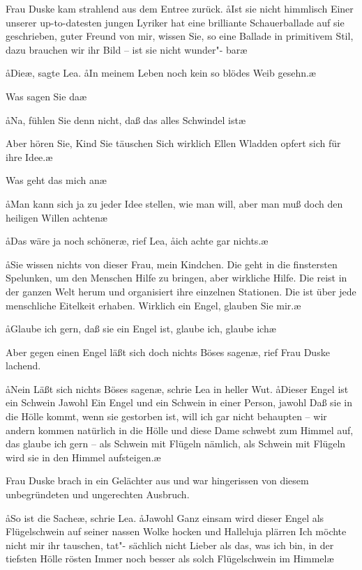 Frau Duske kam strahlend aus dem Entree zurück. \aa{}Ist sie
nicht himmlisch\frag{} Einer unserer up-to-datesten jungen Lyriker
hat eine brilliante Schauerballade auf sie geschrieben, guter
Freund von mir, wissen Sie, so eine Ballade in primitivem
Stil, dazu brauchen wir ihr Bild -- ist sie nicht wunder"-%
bar\frag{}\ae{}

\aa{}Die\frag{}\ae{}, sagte Lea. \aa{}In meinem Leben noch kein so blödes
Weib gesehn.\ae{}

\aanah{}Was sagen Sie da\frag{}\ae{}

\aa{}Na, fühlen Sie denn nicht, daß das alles Schwindel ist\frag{}\ae{}

\aanah{}Aber hören Sie, Kind\ausr{} Sie täuschen Sich\eingriff{eS64-1}{Sich ] sich} wirklich\ausr{} Ellen
Wladden opfert sich für ihre Idee.\ae{}

\aanah{}Was geht das mich an\ausr{}\ae{}

\aa{}Man kann sich ja zu jeder Idee stellen, wie man will, aber man
muß doch den heiligen Willen achten\ausr{}\ae{}

\aa{}Das wäre ja noch schöner\ae{},\eingriff{eS65-1}{schöner\ae{}, ] schöner,\ae{}} rief Lea, \aa{}ich achte gar nichts.\ae{}

\aa{}Sie wissen nichts von dieser Frau, mein Kindchen. Die geht
in die finstersten Spelunken, um den Menschen Hilfe zu
bringen, aber wirkliche Hilfe. Die reist in der ganzen Welt
herum und organisiert ihre einzelnen Stationen. Die ist über
jede menschliche Eitelkeit erhaben. Wirklich ein Engel, glauben
Sie mir.\ae{}

\aa{}Glaube ich gern, daß sie ein Engel ist, glaube ich, glaube ich\ausr{}\ae{}

\aanah{}Aber gegen einen Engel läßt sich doch nichts Böses sagen\frag{}\ae{},
rief Frau Duske lachend.

\aa{}Nein\frag{} Läßt sich nichts Böses sagen\frag{}\ae{}, schrie Lea in heller
Wut. \aa{}Dieser Engel ist ein Schwein\ausr{} Jawohl\ausr{} Ein Engel und
ein Schwein in einer Person, jawohl\ausr{} Daß sie in die Hölle
kommt, wenn sie gestorben ist, will ich gar nicht behaupten --
wir andern kommen natürlich in die Hölle und diese Dame
schwebt zum Himmel auf, das glaube ich gern -- als Schwein
mit Flügeln nämlich, als Schwein mit Flügeln wird sie in den
Himmel aufsteigen.\ae{}

Frau Duske brach in ein Gelächter aus und war hingerissen
von diesem unbegründeten und ungerechten Ausbruch.

\aa{}So ist die Sache\ausr{}\ae{}, schrie Lea. \aa{}Jawohl\ausr{} Ganz einsam wird
dieser Engel als Flügelschwein auf seiner nassen Wolke hocken
und Halleluja plärren\ausr{} Ich möchte nicht mir ihr tauschen, tat"-%
sächlich nicht\ausr{} Lieber als das, was ich bin, in der tiefsten Hölle
rösten\ausr{} Immer noch besser als solch Flügelschwein im
Himmel\ausr{}\ae{}

